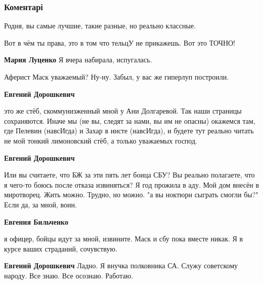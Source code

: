  
 
 
 
 
\subsubsection{Коментарі}
\label{sec:09_11_2021.fb.bilchenko_evgenia.1.vaccinacia.cmt}

\begin{itemize} %
Родня, вы самые лучшие, такие разные, но реально классные.

Вот в чём ты права, это в том что тельцУ не прикажешь. Вот это ТОЧНО!

\begin{itemize} %
\textbf{Мария Луценко} Я вчера набирала, испугалась.
\end{itemize} %

Аферист Маск уважаемый? Ну-ну. Забыл, у вас же гиперлуп построили.

\begin{itemize} %
\textbf{Евгений Дорошкевич} 

это же стёб, скоммунизженный мной у Ани Долгаревой. Так наши страницы
сохраняются. Иначе мы (не вы, следят за нами, вы им не опасны) окажемся там,
где Пелевин (навсИгда) и Захар в инсте (навсИгда), и будете тут реально читать
не мой тонкий лимоновский стёб, а только уважаемых господ.

\textbf{Евгений Дорошкевич} 

Или вы считаете, что БЖ за эти пять лет боица СБУ? Вы реально полагаете, что я
чего-то боюсь после отказа извиняться? Я год прожила в аду. Мой дом внесён в
миротворец. Жить можно. Трудно, но можно. "а вы ноктюрн сыграть смогли бы?"
Если да, за мной, воин.

\textbf{Евгения Бильченко} 

я офицер, бойцы идут за мной, извините. Маск и сбу пока вместе никак. Я в курсе
ваших страданий, сочувствую.

\textbf{Евгений Дорошкевич} Ладно. Я внучка полковника СА. Служу советскому народу. Все знаю. Все осознаю. Работаю.


\end{itemize}
\end{itemize}
